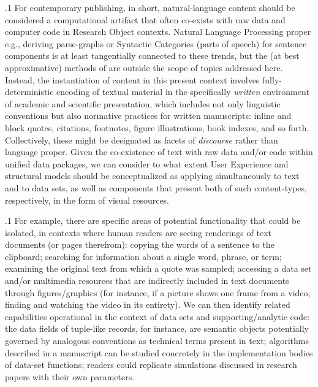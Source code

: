 \documentclass[11pt, twocolumn]{article}
\begin{document}
\p.1{%
For contemporary publishing, in short, natural-language content
should be considered a computational artifact that
often co-exists with raw data and computer code in
Research Object contexts. Natural Language Processing
proper \mdash{} e.g., deriving parse-graphs or Syntactic Categories
(parts of speech) for sentence components \mdash{} is at least
tangentially connected to these trends, but the
(at best approximative) methods of  are outside the
scope of topics addressed here. Instead, the instantiation of
 content in this present context involves
fully-deterministic encoding of textual material in the
specifically \textit{written} environment of academic and scientific
presentation, which includes not only linguistic conventions but
also normative practices for written manuscripts: inline and block quotes, citations,
footnotes, figure illustrations, book indexes, and so forth. Collectively,
these might be designated as facets of \textit{discourse} rather than
language proper. Given the co-existence
of text with raw data and/or code within unified data packages,
we can consider to what extent User Experience and structural
models should be conceptualized as applying simultaneously to
text and to data sets, as well as  components that present
both of such content-types, respectively, in the form of visual resources.
}%

\p.1{%
For example, there are specific areas of potential
 functionality that could be isolated, in contexts where human readers are seeing
renderings of text documents (or pages therefrom): copying
the words of a sentence to the clipboard; searching for
information about a single word, phrase, or term; examining the
original text from which a quote was sampled; accessing a data
set and/or multimedia resources that are indirectly included
in text documents through figures/graphics (for instance,
if a picture shows one frame from a video, finding and
watching the video in its entirety). We can
then identify related capabilities operational in the
context of data sets and supporting/analytic code: the
data fields of tuple-like records, for instance, are semantic
objects potentially governed by analogous conventions as
technical terms present in text; algorithms described in a
manuscript can be studied concretely in the implementation
bodies of data-set functions; readers could replicate simulations
discussed in research papers with their own parameters.
}%
\end{document}
